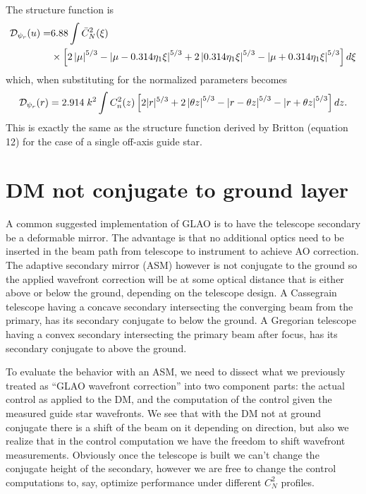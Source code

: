 \documentclass[11pt, oneside]{article}   	%
\begin{document}
The structure function is
\begin{align}
{\cal D}_{\psi_r}(u) = &6.88 \int \bar C_N^2(\xi) \nonumber \\
&\times \left [ 2 \left| \mu \right|^{5/3} - \left| \mu - 0.314 \eta_1 \xi \right|^{5/3} + 2\left|0.314 \eta_1 \xi \right|^{5/3} - \left| \mu + 0.314 \eta_1 \xi \right|^{5/3} \right ] d\xi
\end{align}
which, when substituting for the normalized parameters becomes
\begin{equation}
{\cal D}_{\psi_r}(r) = 2.914 \;k^2 \int C_n^2(z) \left [ 2 |r|^{5/3} + 2 \left | \theta z \right|^{5/3} - \left| r - \theta z \right |^{5/3} - \left| r + \theta z \right |^{5/3}  \right] dz.
\end{equation}
This is exactly the same as the structure function derived by Britton \cite{Britton2006} (equation 12) for the case of a single off-axis guide star.

\section{DM not conjugate to ground layer}
A common suggested implementation of GLAO is to have the telescope secondary be a deformable mirror.  The advantage is that no additional optics need to be inserted in the beam path from telescope to instrument to achieve AO correction. The adaptive secondary mirror (ASM) however is not conjugate to the ground so the applied wavefront correction will be at some optical distance that is either above or below the ground, depending on the telescope design. A Cassegrain telescope having a concave secondary intersecting the converging beam from the primary, has its secondary conjugate to below the ground. A Gregorian telescope having a convex secondary intersecting the primary beam after focus, has its secondary conjugate to above the ground.

To evaluate the behavior with an ASM, we need to dissect what we previously treated as ``GLAO wavefront correction'' into two component parts: the actual control as applied to the DM, and the computation of the control given the measured guide star wavefronts. We see that with the DM not at ground conjugate there is a shift of the beam on it depending on direction, but also we realize that in the control computation we have the freedom to shift wavefront measurements. Obviously once the telescope is built we can't change the conjugate height of the secondary, however we are free to change the control computations to, say, optimize performance under different $C_N^2$ profiles.
\end{document}
